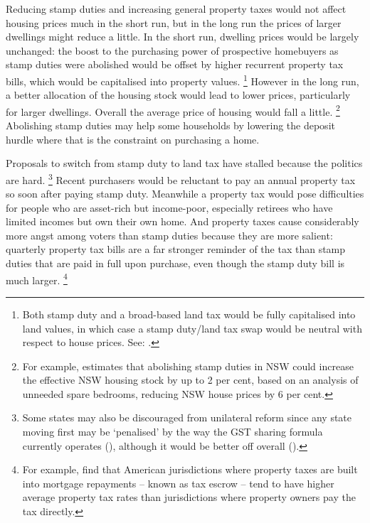 Reducing stamp duties and increasing general property taxes would not affect housing prices much in the short run, but in the long run the prices of larger dwellings might reduce a little.
In the short run, dwelling prices would be largely unchanged: the boost to the purchasing power of prospective homebuyers as stamp duties were abolished would be offset by higher recurrent property tax bills, which would be capitalised into property values.%
	\footnote{Both stamp duty and a broad-based land tax would be fully capitalised into land values, in which case a stamp duty/land tax swap would be neutral with respect to house prices.
    See: \textcites{Coates2017PropertyTaxReformAdelaide}[][5]{Freebairn-2017-Reform-options-for-state-property-taxes}.}
However in the long run, a better allocation of the housing stock would lead to lower prices, particularly for larger dwellings.
Overall the average price of housing would fall a little.%
	\footnote{For example, \textcite{Abelson-2016-Housing-costs-policies} estimates that abolishing stamp duties in NSW could increase the effective NSW housing stock by up to 2 per cent, based on an analysis of unneeded spare bedrooms, reducing NSW house prices by 6 per cent.} %
Abolishing stamp duties may help some households by lowering the deposit hurdle where that is the constraint on purchasing a home. 

Proposals to switch from stamp duty to land tax have stalled because the politics are hard.%
    \footnote{Some states may also be discouraged from unilateral reform since any state moving first may be `penalised' by the way the GST sharing formula currently operates (\textcite[][100]{PC-2017-HFE-draft-report}), although it would be better off overall (\textcite[][8--10]{DaleyCoates-2015-Property-taxes}).}
Recent purchasers would be reluctant to pay an annual property tax so soon after paying stamp duty.
Meanwhile a property tax would pose difficulties for people who are asset-rich but income-poor, especially retirees who have limited incomes but own their own home.
And property taxes cause considerably more angst among voters than stamp duties because they are more salient: quarterly property tax bills are a far stronger reminder of the tax than stamp duties that are paid in full upon purchase, even though the stamp duty bill is much larger.%
	\footnote{For example, \textcite{CabralHoxby2012} find that American jurisdictions where property taxes are built into mortgage repayments -- known as tax escrow -- tend to have higher average property tax rates than jurisdictions where property owners pay the tax directly.} 

